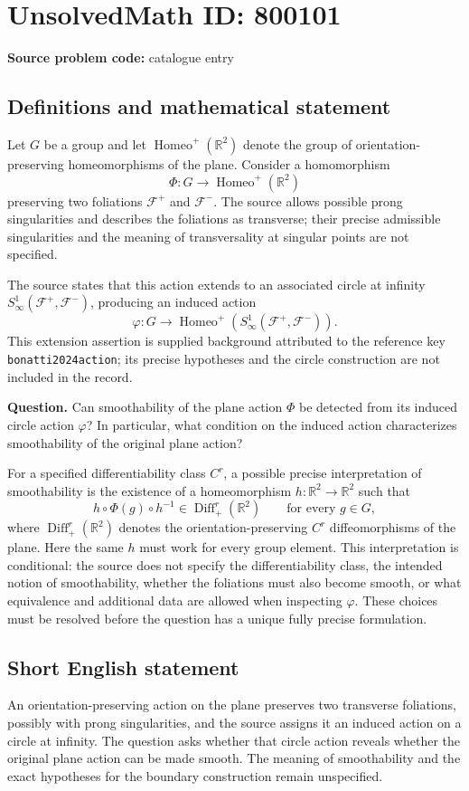 \documentclass[11pt]{article}
\newcommand{\R}{\mathbb{R}}
\begin{document}
\section*{UnsolvedMath ID: 800101}
\textbf{Source problem code:} catalogue entry
\subsection{Definitions and mathematical statement}
Let \(G\) be a group and let \(\operatorname{Homeo}^{+}(\R^{2})\) denote the group of orientation-preserving homeomorphisms of the plane. Consider a homomorphism
\[
\Phi\colon G\longrightarrow\operatorname{Homeo}^{+}(\R^{2})
\]
preserving two foliations \(\mathcal F^{+}\) and \(\mathcal F^{-}\). The source allows possible prong singularities and describes the foliations as transverse; their precise admissible singularities and the meaning of transversality at singular points are not specified.

The source states that this action extends to an associated circle at infinity \(S^{1}_{\infty}(\mathcal F^{+},\mathcal F^{-})\), producing an induced action
\[
\varphi\colon G\longrightarrow
\operatorname{Homeo}^{+}\!\left(S^{1}_{\infty}(\mathcal F^{+},\mathcal F^{-})\right).
\]
This extension assertion is supplied background attributed to the reference key \texttt{bonatti2024action}; its precise hypotheses and the circle construction are not included in the record.

\textbf{Question.} Can smoothability of the plane action \(\Phi\) be detected from its induced circle action \(\varphi\)? In particular, what condition on the induced action characterizes smoothability of the original plane action?

For a specified differentiability class \(C^{r}\), a possible precise interpretation of smoothability is the existence of a homeomorphism \(h\colon\R^{2}\to\R^{2}\) such that
\[
 h\circ\Phi(g)\circ h^{-1}\in\operatorname{Diff}^{r}_{+}(\R^{2})
 \qquad\text{for every }g\in G,
\]
where \(\operatorname{Diff}^{r}_{+}(\R^{2})\) denotes the orientation-preserving \(C^{r}\) diffeomorphisms of the plane. Here the same \(h\) must work for every group element. This interpretation is conditional: the source does not specify the differentiability class, the intended notion of smoothability, whether the foliations must also become smooth, or what equivalence and additional data are allowed when inspecting \(\varphi\). These choices must be resolved before the question has a unique fully precise formulation.
\subsection{Short English statement}
An orientation-preserving action on the plane preserves two transverse foliations, possibly with prong singularities, and the source assigns it an induced action on a circle at infinity. The question asks whether that circle action reveals whether the original plane action can be made smooth. The meaning of smoothability and the exact hypotheses for the boundary construction remain unspecified.
\end{document}
